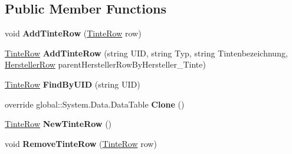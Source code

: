 \subsection*{Public Member Functions}
\begin{DoxyCompactItemize}
\item 
void {\bfseries Add\+Tinte\+Row} (\hyperlink{class_products_1_1_data_1_1ds_sage_1_1_tinte_row}{Tinte\+Row} row)\hypertarget{class_products_1_1_data_1_1ds_sage_1_1_tinte_data_table_af07f4efdeeab0a2e28ce4dab5c959e34}{}\label{class_products_1_1_data_1_1ds_sage_1_1_tinte_data_table_af07f4efdeeab0a2e28ce4dab5c959e34}

\item 
\hyperlink{class_products_1_1_data_1_1ds_sage_1_1_tinte_row}{Tinte\+Row} {\bfseries Add\+Tinte\+Row} (string U\+ID, string Typ, string Tintenbezeichnung, \hyperlink{class_products_1_1_data_1_1ds_sage_1_1_hersteller_row}{Hersteller\+Row} parent\+Hersteller\+Row\+By\+Hersteller\+\_\+\+Tinte)\hypertarget{class_products_1_1_data_1_1ds_sage_1_1_tinte_data_table_a2f876aa996865b1ec897a9af9b70158f}{}\label{class_products_1_1_data_1_1ds_sage_1_1_tinte_data_table_a2f876aa996865b1ec897a9af9b70158f}

\item 
\hyperlink{class_products_1_1_data_1_1ds_sage_1_1_tinte_row}{Tinte\+Row} {\bfseries Find\+By\+U\+ID} (string U\+ID)\hypertarget{class_products_1_1_data_1_1ds_sage_1_1_tinte_data_table_a47684b3e4146834ce78946798526cff4}{}\label{class_products_1_1_data_1_1ds_sage_1_1_tinte_data_table_a47684b3e4146834ce78946798526cff4}

\item 
override global\+::\+System.\+Data.\+Data\+Table {\bfseries Clone} ()\hypertarget{class_products_1_1_data_1_1ds_sage_1_1_tinte_data_table_a562905d1a919a30de0176d71748f22ca}{}\label{class_products_1_1_data_1_1ds_sage_1_1_tinte_data_table_a562905d1a919a30de0176d71748f22ca}

\item 
\hyperlink{class_products_1_1_data_1_1ds_sage_1_1_tinte_row}{Tinte\+Row} {\bfseries New\+Tinte\+Row} ()\hypertarget{class_products_1_1_data_1_1ds_sage_1_1_tinte_data_table_a8030ab17838b08b78d6ee9bcf358538f}{}\label{class_products_1_1_data_1_1ds_sage_1_1_tinte_data_table_a8030ab17838b08b78d6ee9bcf358538f}

\item 
void {\bfseries Remove\+Tinte\+Row} (\hyperlink{class_products_1_1_data_1_1ds_sage_1_1_tinte_row}{Tinte\+Row} row)\hypertarget{class_products_1_1_data_1_1ds_sage_1_1_tinte_data_table_a21ecbff049467800d7bcbbcb068fa709}{}\label{class_products_1_1_data_1_1ds_sage_1_1_tinte_data_table_a21ecbff049467800d7bcbbcb068fa709}

\end{DoxyCompactItemize}
